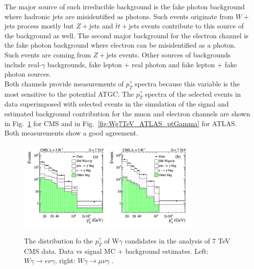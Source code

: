 The major source of such irreducible background is the fake photon background where hadronic jets are misidentified as photons. Such events originate from $W+$jets process mostly but $Z+$jets and $\bar{t}t+$jets events contribute to this source of the background as well. The second major background for the electron channel is the fake photon background where electron can be misidentified as a photon.  Such events are coming from $Z+$jets events. Other sources of backgrounds include real-$\gamma$ backgrounds, fake lepton + real photon and fake lepton + fake photon sources.\\

Both channels provide measurements of $p_T^\gamma$ spectra because this variable is the most sensitive to the potential ATGC. The $p_T^\gamma$ spectra of the selected events in data superimposed with selected events in the simulation of the signal and estimated background contribution for the muon and electron channels are shown in Fig.~\ref{fig:Wg7TeV_CMS_ptGamma} for CMS and in Fig.~\ref{fig:Wg7TeV_ATLAS_ptGamma} for ATLAS. Both measurements show a good agreement.\\

\begin{figure}[htb]
  \begin{center}
    {\includegraphics[width=0.80\textwidth]{../figs/WgAbout/Wg7TeV_CMS_ptGamma.png}}
    \caption{The distribution fo the $p_T^\gamma$ of W$\gamma$ candidates in the analysis of 7 TeV CMS data. Data vs signal MC + background estimates. Left: $W\gamma\rightarrow e\nu\gamma$, right: $W\gamma\rightarrow \mu\nu\gamma$ \cite{ref_7TeV_CMS}.}
    \label{fig:Wg7TeV_CMS_ptGamma}
  \end{center}
\end{figure}

